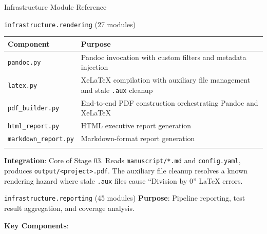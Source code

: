 \documentclass[
  ignorenonframetext,
]{beamer}
\newcounter{none} %
\begin{document}
\begin{frame}[fragile]{Infrastructure Module Reference}
\begin{block}{\texttt{infrastructure.rendering} (27 modules)}
{\def\LTcaptype{none} %
\begin{longtable}[]{@{}
  >{\raggedright\arraybackslash}p{}
  >{\raggedright\arraybackslash}p{}@{}}
\toprule\noalign{}
\begin{minipage}[b]{\linewidth}\raggedright
Component
\end{minipage} & \begin{minipage}[b]{\linewidth}\raggedright
Purpose
\end{minipage} \\
\midrule\noalign{}
\endhead
\texttt{pandoc.py} & Pandoc invocation with custom filters and metadata
injection \\
\texttt{latex.py} & XeLaTeX compilation with auxiliary file management
and stale \texttt{.aux} cleanup \\
\texttt{pdf\_builder.py} & End-to-end PDF construction orchestrating
Pandoc and XeLaTeX \\
\texttt{html\_report.py} & HTML executive report generation \\
\texttt{markdown\_report.py} & Markdown-format report generation \\
\bottomrule\noalign{}
\end{longtable}
}

\textbf{Integration}: Core of Stage 03. Reads \texttt{manuscript/*.md}
and \texttt{config.yaml}, produces
\texttt{output/\textless{}project\textgreater{}.pdf}. The auxiliary file
cleanup resolves a known rendering hazard where stale \texttt{.aux}
files cause ``Division by 0'' LaTeX errors.
\end{block}

\begin{block}{\texttt{infrastructure.reporting} (45 modules)}
\protect{}\label{infrastructure.reporting-45-modules}
\textbf{Purpose}: Pipeline reporting, test result aggregation, and
coverage analysis.

\textbf{Key Components}:


\end{block}
\end{frame}
\end{document}

